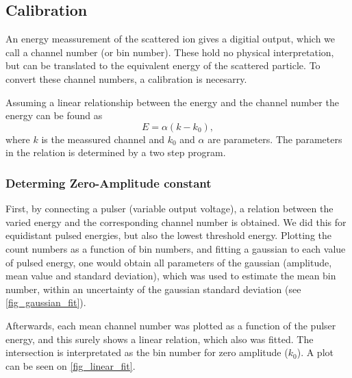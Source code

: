 \subsection{Calibration}
An energy meassurement of the scattered ion gives a digitial output, which we call
a channel number (or bin number). These hold no physical interpretation, but
can be translated to the equivalent energy of the scattered particle. To
convert these channel numbers, a calibration is necesarry. 

Assuming a linear relationship between the energy and the channel number the
energy can be found as
\begin{equation}
E = \alpha(k - k_0),
\end{equation}
where $k$ is the meassured channel and $k_0$ and $\alpha$ are parameters. The
parameters in the relation is determined by a two step program.

\subsubsection{Determing Zero-Amplitude constant}
First, by connecting a pulser (variable output voltage), a relation between the
varied energy and the corresponding channel number is obtained. 
We did this for equidistant pulsed energies, but also the lowest threshold
energy. Plotting the count numbers as a function of bin numbers, and fitting a
gaussian to each value of pulsed energy, one would obtain all parameters of the
gaussian (amplitude, mean value and standard deviation), which was used to
estimate the mean bin number, within an uncertainty of the gaussian standard deviation (see
\cref{fig_gaussian_fit}). 

Afterwards, each mean channel number was plotted as a function of the pulser
energy, and this surely shows a linear relation, which also was fitted. The
intersection is interpretated as the bin number for zero amplitude ($k_0$). A
plot can be seen on \cref{fig_linear_fit}.



